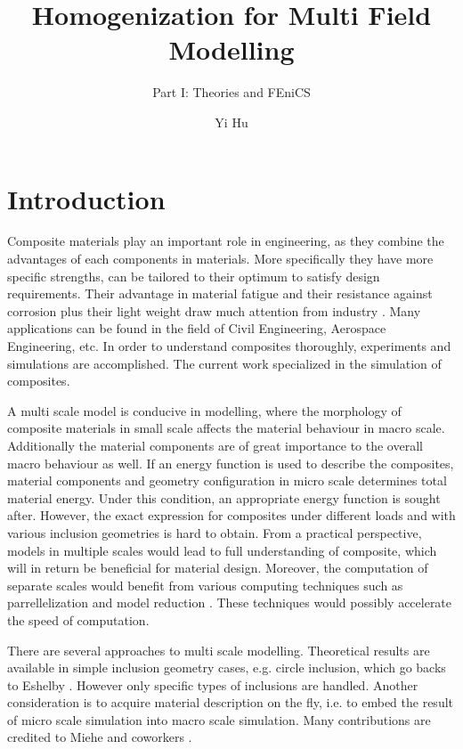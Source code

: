 \documentclass[10pt,a4paper]{scrreprt}
\author{Yi Hu}
\title{Homogenization for Multi Field Modelling}
\subtitle{Part I: Theories and FEniCS}
\begin{document}
\chapter{Introduction}

Composite materials play an important role in engineering, as they combine the advantages of each components in materials. More specifically they have more specific strengths, can be tailored to their optimum to satisfy design requirements. Their advantage in material fatigue and their resistance against corrosion plus their light weight draw much attention from industry \citep{campbell_structural_2010}. Many applications can be found in the field of Civil Engineering, Aerospace Engineering, etc. In order to understand composites thoroughly, experiments and simulations are accomplished. The current work specialized in the simulation of composites.

A multi scale model is conducive in modelling, where the morphology of composite materials in small scale affects the material behaviour in macro scale. Additionally the material components are of great importance to the overall macro behaviour as well. If an energy function is used to describe the composites, material components and geometry configuration in micro scale determines total material energy. Under this condition, an appropriate energy function is sought after. However, the exact expression for composites under different loads and with various inclusion geometries is hard to obtain. From a practical perspective, models in multiple scales would lead to full understanding of composite, which will in return be beneficial for material design. Moreover, the computation of separate scales would benefit from various computing techniques such as parrellelization \citep{feyel_fe2_2000} and model reduction \citep{fritzen_reduced_2013}. These techniques would possibly accelerate the speed of computation. 

There are several approaches to multi scale modelling. Theoretical results are available in simple inclusion geometry cases, e.g. circle inclusion, which go backs to Eshelby \citep{li_eshelby_2007}. However only specific types of inclusions are handled. Another consideration is to acquire material description on the fly, i.e. to embed the result of micro scale simulation into macro scale simulation. Many contributions are credited to Miehe and coworkers \citep{miehe_computational_1999-1} \citep{miehe_computational_2003} \citep{miehe_strain-driven_2002} \citep{miehe_computational_2002}.
\end{document}
